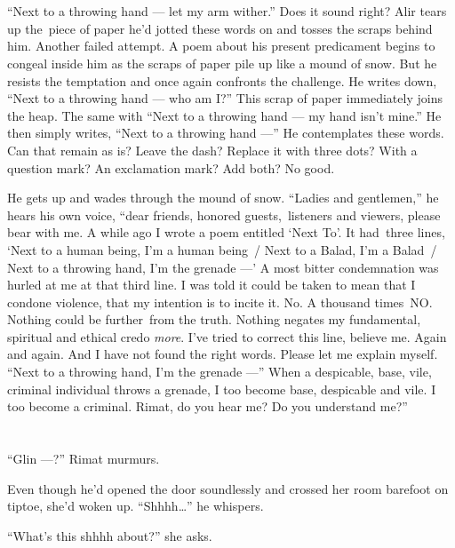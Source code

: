 \documentclass[twoside,11pt]{book}
\begin{document}
\chapter{}

``Next to a throwing hand --- let my arm wither.'' Does it sound right? Alir tears up the~piece of paper he'd
jotted these words on{ }and tosses the scraps behind him. Another failed
attempt.  A poem about his present predicament begins to congeal inside him as the scraps of paper pile up like a mound
of snow. But he resists the temptation and once again confronts the challenge. He writes down, ``Next to a
throwing hand --- who am I?'' This scrap of paper immediately joins the heap. The same with
``Next to a throwing hand --- my hand isn't mine.'' He then
simply{ }writes, ``Next to a throwing hand ---'' He
contemplates these words. Can that remain as is? Leave the dash?  Replace it with three dots? With a question mark?
An exclamation mark? Add both? No good.

He gets up and wades through the mound of snow. ``Ladies and gentlemen,'' he hears his own
voice, ``dear friends, honored guests,~listeners and viewers, please bear with me. A while ago I wrote a
poem entitled `Next To'. It had~three lines, `Next to a human being, I'm a
human being~/ Next to a Balad, I'm a Balad~/ Next to a throwing hand, I'm the grenade ---' A most bitter
condemnation was hurled at me at that  third line. I was told it could be taken to mean that I condone violence, that
my intention is to incite it. No. A thousand times~NO.  Nothing could be further~from the truth. Nothing negates my
fundamental, spiritual and ethical credo \textit{more}. I've tried to correct this line, believe me. Again and again.
And I have not found the right words. Please let me explain myself. ``Next to a throwing hand, I'm the
grenade ---'' When a despicable, base, vile, criminal individual throws a grenade, I too become base,
despicable{ }and vile. I too become a criminal. Rimat, do you hear me? Do you
understand me?''



\chapter{}

``Glin ---?'' Rimat murmurs.

Even though he'd opened the door soundlessly and crossed her room barefoot on tiptoe, she'd woken up.
``Shhhh{\ldots}'' he whispers.

``What's this shhhh about?'' she asks.
\end{document}

